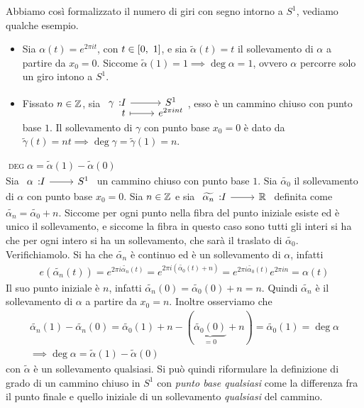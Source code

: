 Abbiamo così formalizzato il numero di giri con segno intorno a $S^1$, vediamo qualche esempio.
\begin{examples}
	\begin{itemize} 
		\item Sia $\alpha(t)=e^{2\pi i t}$, con $t\in\left[0,\ 1\right]$, e sia $\widetilde{\alpha}(t)=t$ il sollevamento di $\alpha$ a partire da $x_0=0$. Siccome $\widetilde{\alpha}(1)=1\implies \deg\alpha=1$, ovvero $\alpha$ percorre solo un giro intono a $S^1$.
		\item Fissato $n\in\mathbb{Z}$, sia $\displaystyle \funztot \gamma I {S^1} t {e^{2\pi i nt}}$, esso è un cammino chiuso con punto base $1$. Il sollevamento di $\gamma$ con punto base $x_0=0$ è dato da $\widetilde{\gamma}(t)=nt \implies \deg\gamma=\widetilde{\gamma}(1)=n.$
	\end{itemize}	
\end{examples}

\begin{observe} \textsc{$\deg\alpha = \widetilde{\alpha}(1)- \widetilde{\alpha}(0)$}\\
	Sia $\funz \alpha I {S^1}$ un cammino chiuso con punto base $1$. Sia $\widetilde{\alpha_0}$ il sollevamento di $\alpha$ con punto base $x_0=0$. Sia $n\in\mathbb{Z}$ e sia $\funz {\widetilde{\alpha_n}} I \realset$ definita come $\widetilde{\alpha_n}=\widetilde{\alpha_0}+n$. 
	Siccome per ogni punto nella fibra del punto iniziale esiste ed è unico il sollevamento, e siccome la fibra in questo caso sono tutti gli interi si ha che per ogni intero si ha un sollevamento, che sarà il traslato di $\widetilde{\alpha_0}$. Verifichiamolo.\newline
	Si ha che $\widetilde{\alpha_n}$ è continuo ed è un sollevamento di $\alpha$, infatti
		\begin{gather*}
			e\left( \widetilde{\alpha_n}(t) \right)= e^{2\pi i \widetilde{\alpha_n}(t)}= e^{2\pi i (\widetilde{\alpha_0}(t)+n)}=e^{2\pi i \widetilde{\alpha_0}(t)} e^{2\pi i n}=\alpha(t)
		\end{gather*}
	Il suo punto iniziale è $n$, infatti $\widetilde{\alpha_n}(0)=\widetilde{\alpha_0}(0)+n=n$.	Quindi $\widetilde{\alpha_n}$ è il sollevamento di $\alpha$ a partire da $x_0=n$.\newline
	Inoltre osserviamo che 
		\begin{gather*}
			\widetilde{\alpha_n}(1)- \widetilde{\alpha_n}(0)=\widetilde{\alpha_0}(1)+n - (\underbrace{\widetilde{\alpha_0}(0)}_{=0}+n)= \widetilde{\alpha_0}(1)=\deg\alpha\\
			\implies \deg\alpha= \widetilde{\alpha}(1)-\widetilde{\alpha}(0)
		\end{gather*}
	con $\widetilde{\alpha}$ è un sollevamento qualsiasi.\newline
	Si può quindi riformulare la definizione di grado di un cammino chiuso in $S^1$ con \textit{punto base qualsiasi} come la differenza fra il punto finale e quello iniziale di un sollevamento \textit{qualsiasi} del cammino.
\end{observe}

